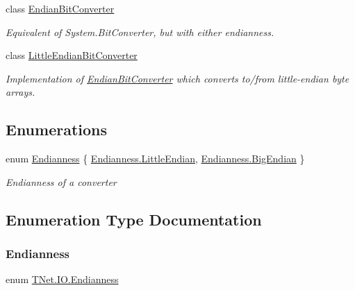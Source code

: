 \begin{DoxyCompactItemize}
class \mbox{\hyperlink{class_t_net_1_1_i_o_1_1_endian_bit_converter}{Endian\+Bit\+Converter}}
\begin{DoxyCompactList}\small\item\em Equivalent of System.\+Bit\+Converter, but with either endianness. \end{DoxyCompactList}\item 
class \mbox{\hyperlink{class_t_net_1_1_i_o_1_1_little_endian_bit_converter}{Little\+Endian\+Bit\+Converter}}
\begin{DoxyCompactList}\small\item\em Implementation of \mbox{\hyperlink{class_t_net_1_1_i_o_1_1_endian_bit_converter}{Endian\+Bit\+Converter}} which converts to/from little-\/endian byte arrays. \end{DoxyCompactList}\end{DoxyCompactItemize}
\subsection*{Enumerations}
\begin{DoxyCompactItemize}
\item 
enum \mbox{\hyperlink{namespace_t_net_1_1_i_o_afd413ccca7a2b11b5a201325685881dc}{Endianness}} \{ \mbox{\hyperlink{namespace_t_net_1_1_i_o_afd413ccca7a2b11b5a201325685881dca3c0ba6b22b526d7fd50c3026435a8c02}{Endianness.\+Little\+Endian}}, 
\mbox{\hyperlink{namespace_t_net_1_1_i_o_afd413ccca7a2b11b5a201325685881dca2ce7a92ae43763828ac4acb4560c2a5b}{Endianness.\+Big\+Endian}}
 \}
\begin{DoxyCompactList}\small\item\em Endianness of a converter \end{DoxyCompactList}\end{DoxyCompactItemize}


\subsection{Enumeration Type Documentation}
\mbox{\label{namespace_t_net_1_1_i_o_afd413ccca7a2b11b5a201325685881dc}} 
\subsubsection{\texorpdfstring{Endianness}{Endianness}}
{\footnotesize\ttfamily enum \mbox{\hyperlink{namespace_t_net_1_1_i_o_afd413ccca7a2b11b5a201325685881dc}{T\+Net.\+I\+O.\+Endianness}}\hspace{0.3cm}{\ttfamily [strong]}}



